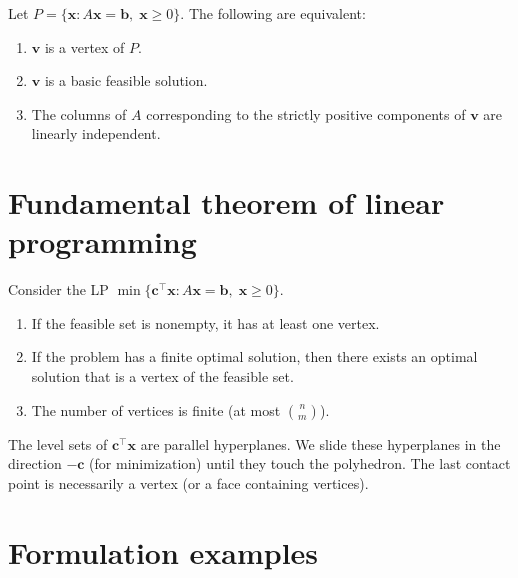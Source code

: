\begin{theorem}
\label{thm:vertex_bfs}
Let $P = \{\mathbf{x} : A\mathbf{x} = \mathbf{b},\; \mathbf{x} \ge 0\}$.
The following are equivalent:
\begin{enumerate}
  \item $\mathbf{v}$ is a vertex of $P$.
  \item $\mathbf{v}$ is a basic feasible solution.
  \item The columns of $A$ corresponding to the strictly positive components
        of $\mathbf{v}$ are linearly independent.
\end{enumerate}
\end{theorem}

\section{Fundamental theorem of linear programming}

\begin{theorem}
\label{thm:fundamental_lp}
Consider the LP $\min\{\mathbf{c}^\top\mathbf{x} :
A\mathbf{x} = \mathbf{b},\; \mathbf{x} \ge 0\}$.
\begin{enumerate}
  \item If the feasible set is nonempty, it has at least one vertex.
  \item If the problem has a finite optimal solution, then there exists an
        optimal solution that is a vertex of the feasible set.
  \item The number of vertices is finite (at most $\binom{n}{m}$).
\end{enumerate}
\end{theorem}

\begin{intuition}[title=\textbf{Why is the optimum at a vertex?}]
The level sets of $\mathbf{c}^\top\mathbf{x}$ are parallel hyperplanes.
We slide these hyperplanes in the direction $-\mathbf{c}$ (for minimization)
until they touch the polyhedron.  The last contact point is necessarily a
vertex (or a face containing vertices).
\end{intuition}

\section{Formulation examples}

